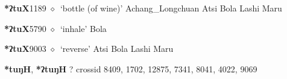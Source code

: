   \begin{list}{}{\leftmargin=1.5em \itemindent=-1.5em}
  \item {\footnotesize \textbf{*ʔtuX}}{\tiny 1189}
         $\diamond$~`bottle (of wine)'
         Achang\_Longchuan 
\hspace{1ex}
         Atsi 
\hspace{1ex}
         Bola 
\hspace{1ex}
         Lashi 
\hspace{1ex}
         Maru 
  \item {\footnotesize \textbf{*ʔtuX}}{\tiny 5790}
\hspace{1ex}
         $\diamond$~`inhale'
         Bola 
  \item {\footnotesize \textbf{*ʔtuX}}{\tiny 9003}
\hspace{1ex}
         $\diamond$~`reverse'
         Atsi 
\hspace{1ex}
         Bola 
\hspace{1ex}
         Lashi 
\hspace{1ex}
         Maru 
  \end{list}
\item
\textbf{*tuŋH}, \textbf{*ʔtuŋH}
?
  {\tiny crossid 8409, 1702, 12875, 7341, 8041, 4022, 9069}
